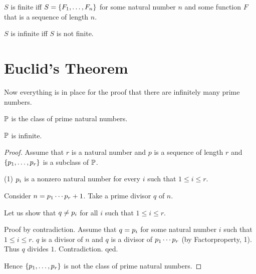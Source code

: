 \documentclass[11pt]{article}
\begin{document}
\begin{forthel}

\begin{definition} $S$ is finite iff
$S = \{F_{1},\dots,F_{n}\}$ for some natural number $n$ and some function $F$ that is
a sequence of length $n$.
\end{definition}

\begin{definition} $S$ is infinite iff $S$ is not finite.
\end{definition}

\end{forthel}

\section{Euclid's Theorem}

Now everything is in place for the proof that there
are infinitely many prime numbers.
\begin{forthel}

\begin{signature} $\mathbb{P}$ is the class of prime natural numbers.
\end{signature}



\begin{theorem}[Euclid]
$\mathbb{P}$ is infinite.
\end{theorem}
\begin{proof}
Assume that $r$ is a natural number and
$p$ is a sequence of length $r$ and
$\{p_{1},\dots,p_{r}\}$ is a subclass of $\mathbb{P}$.

(1) $p_{i}$ is a nonzero natural number for every $i$ such
that $1 \leq i \leq r$.

Consider $n=p_{1} \cdots p_{r}+1$.
Take a prime divisor $q$ of $n$.

Let us show that $q \neq p_{i}$ for all $i$ such that
$1 \leq i \leq r$.

Proof by contradiction.
Assume that $q=p_{i}$ for some natural number $i$ such that
$1 \leq i \leq r$.
$q$ is a divisor of $n$ and $q$ is a divisor of $p_{1} \cdots p_{r}$
(by Factorproperty, 1).
Thus $q$ divides $1$. Contradiction. qed.

Hence $\{p_{1},\dots,p_{r}\}$ is not the class of prime natural numbers.
\end{proof}
\end{forthel}
\end{document}

